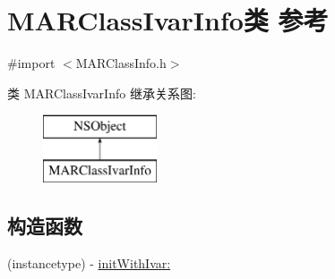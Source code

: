\hypertarget{interface_m_a_r_class_ivar_info}{}\section{M\+A\+R\+Class\+Ivar\+Info类 参考}
\label{interface_m_a_r_class_ivar_info}


{\ttfamily \#import $<$M\+A\+R\+Class\+Info.\+h$>$}

类 M\+A\+R\+Class\+Ivar\+Info 继承关系图\+:\begin{figure}[H]
\begin{center}
\leavevmode
\includegraphics[height=2.000000cm]{interface_m_a_r_class_ivar_info}
\end{center}
\end{figure}
\subsection*{构造函数}
\begin{DoxyCompactItemize}
\item 
(instancetype) -\/ \hyperlink{interface_m_a_r_class_ivar_info_a44696dac61d9c0b319f3e1579c1cae6c}{init\+With\+Ivar\+:}
\end{DoxyCompactItemize}

